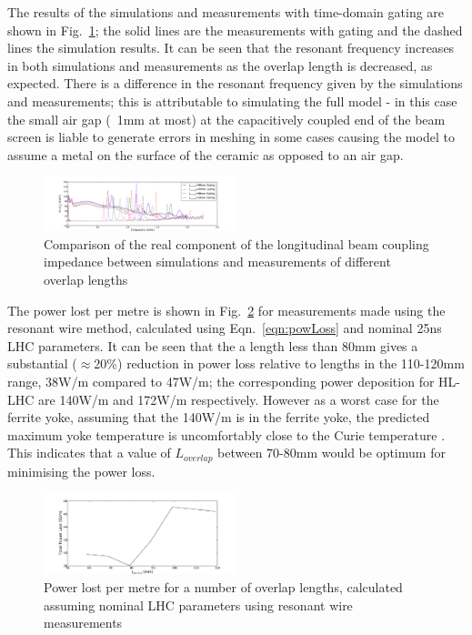 \documentclass[a4paper,
              ]{jacow}
\begin{document}
The results of the simulations and measurements with time-domain gating are shown in Fig.~\ref{fig:simMeasComp}; the solid lines are the measurements with gating and the dashed lines the simulation results. It can be seen that the resonant frequency increases in both simulations and measurements as the overlap length is decreased, as expected. There is a difference in the resonant frequency given by the simulations and measurements; this is attributable to simulating the full model - in this case the small air gap (~1mm at most) at the capacitively coupled end of the beam screen is liable to generate errors in meshing in some cases causing the model to assume a metal on the surface of the ceramic as opposed to an air gap.

\begin{figure}
\begin{center}
\includegraphics[width=0.5\textwidth]{simMeasGatingOverlap.pdf}
\caption{Comparison of the real component of the longitudinal beam coupling impedance between simulations and measurements of different overlap lengths}
\label{fig:simMeasComp}
\end{center}
\end{figure}

The power lost per metre is shown in Fig.~\ref{fig:powLossTotal} for measurements made using the resonant wire method, calculated using Eqn.~\ref{eqn:powLoss} and nominal 25ns LHC parameters. It can be seen that the a length less than 80mm gives a substantial ($\approx$20\%) reduction in power loss relative to lengths in the 110-120mm range, 38W/m compared to 47W/m; the corresponding power deposition for HL-LHC are 140W/m and 172W/m respectively. However as a worst case for the ferrite yoke, assuming that the 140W/m is in the ferrite yoke, the predicted maximum yoke temperature is uncomfortably close to the Curie temperature \cite{lorenaStrat}. This indicates that a value of $L_{overlap}$ between 70-80mm would be optimum for minimising the power loss.

\begin{figure}
\begin{center}
\includegraphics[width=0.5\textwidth]{heatingOverlapFull.pdf}
\caption{Power lost per metre for a number of overlap lengths, calculated assuming nominal LHC parameters using resonant wire measurements}
\label{fig:powLossTotal}
\end{center}
\end{figure}
\end{document}
